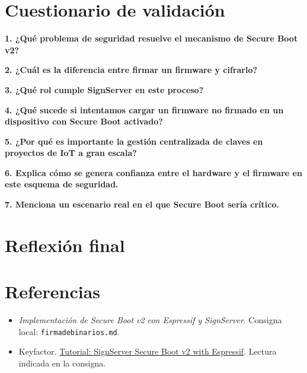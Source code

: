 \documentclass[12pt,a4paper]{article}
\begin{document}
\newpage
\section{Cuestionario de validación}
\par\textbf{1. ¿Qué problema de seguridad resuelve el mecanismo de Secure Boot v2?}


\par\textbf{2. ¿Cuál es la diferencia entre firmar un firmware y cifrarlo?}


\par\textbf{3. ¿Qué rol cumple SignServer en este proceso?}


\par\textbf{4. ¿Qué sucede si intentamos cargar un firmware no firmado en un dispositivo con Secure Boot activado?}


\par\textbf{5. ¿Por qué es importante la gestión centralizada de claves en proyectos de IoT a gran escala?}


\par\textbf{6. Explica cómo se genera confianza entre el hardware y el firmware en este esquema de seguridad.}


\par\textbf{7. Menciona un escenario real en el que Secure Boot sería crítico.}


\section{Reflexión final}

\section{Referencias}
\begin{itemize}
    \item \textit{Implementación de Secure Boot v2 con Espressif y SignServer}. Consigna local: \texttt{firmadebinarios.md}.
    \item Keyfactor. \href{https://docs.keyfactor.com/signserver/7.0/tutorial-signserver-secure-boot-v2-with-espressif-}{Tutorial: SignServer Secure Boot v2 with Espressif}. Lectura indicada en la consigna.
\end{itemize}
\end{document}
